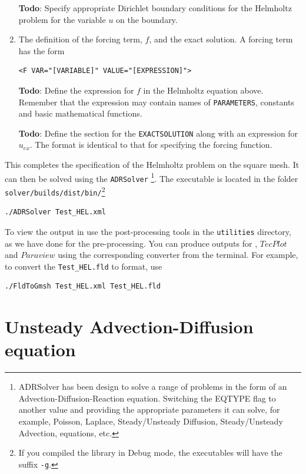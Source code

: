 \documentclass[a4paper,12pt]{article}
\begin{document}
\begin{enumerate}
\textbf{Todo}: Specify appropriate Dirichlet boundary conditions for
the Helmholtz problem for the variable $u$ on the boundary.

\item The definition of the forcing term, $f$, and the exact solution. A forcing
term has the form
\begin{verbatim}
<F VAR="[VARIABLE]" VALUE="[EXPRESSION]">
\end{verbatim}

\textbf{Todo}: Define the expression for $f$ in the Helmholtz equation above.
Remember that the expression may contain names of \texttt{PARAMETERS},
constants and basic mathematical functions.

\textbf{Todo}: Define the section for the \texttt{EXACTSOLUTION} along with an
expression for $u_{ex}$. The format is identical to that for specifying the
forcing function.

\end{enumerate}

This completes the specification of the Helmholtz problem on the square mesh.
It can then be solved using the \texttt{ADRSolver}
\footnote{ADRSolver has been design to solve a range of problems in the form of
an Advection-Diffusion-Reaction equation. Switching the EQTYPE flag to
another value and providing the appropriate parameters it can solve, for
example, Poisson, Laplace, Steady/Unsteady Diffusion, Steady/Unsteady Advection,
equations, etc.}. The executable is located in the folder
\texttt{solver/builds/dist/bin/}\footnote{If you compiled the library in Debug
mode, the executables will have the suffix \texttt{-g}.}

\begin{verbatim}
./ADRSolver Test_HEL.xml
\end{verbatim}

To view the output in \gmsh use the post-processing
tools in the \texttt{utilities} directory, as we have done for the
pre-processing. You can produce outputs for \gmsh, $TecPlot$ and $Paraview$
using the corresponding converter from the terminal. For example, to convert the
\texttt{Test\_HEL.fld} to \gmsh format, use

\begin{verbatim}
./FldToGmsh Test_HEL.xml Test_HEL.fld
\end{verbatim} 


\clearpage
\section{Unsteady Advection-Diffusion equation}
\end{document}
